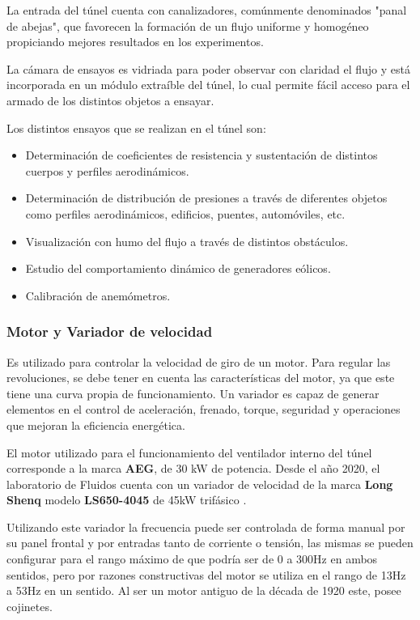 	La entrada del túnel cuenta con canalizadores, comúnmente denominados "panal de abejas", que favorecen la formación de un flujo uniforme y homogéneo propiciando mejores resultados en los experimentos.
	
	La cámara de ensayos es vidriada para poder observar con claridad el flujo y está incorporada en un módulo extraíble del túnel, lo cual permite fácil acceso para el armado de los distintos objetos a ensayar.
	
	Los distintos ensayos que se realizan en el túnel son:
	\begin{itemize}
		\item  Determinación de coeficientes de resistencia y sustentación de distintos cuerpos y perfiles aerodinámicos. 
		\item Determinación de distribución de presiones a través de diferentes objetos como perfiles aerodinámicos, edificios, puentes, automóviles, etc.
		\item Visualización con humo del flujo a través de distintos obstáculos.
		\item Estudio del comportamiento dinámico de generadores eólicos. 
		\item Calibración de anemómetros.
	\end{itemize}

	\subsubsection{Motor y Variador de velocidad}
		\begin{tcolorbox}[colback=blue!5!white,colframe=blue!75!black,title=Variador de velocidad]
			Es utilizado para controlar la velocidad de giro de un motor. Para regular las revoluciones, se debe tener en cuenta las características del motor, ya que este tiene  una  curva  propia  de  funcionamiento.  Un  variador  es  capaz  de  generar elementos en el  control  de  aceleración,  frenado, torque,  seguridad  y operaciones que mejoran la eficiencia energética.\end{tcolorbox}	

		
El motor utilizado para el funcionamiento del ventilador interno del túnel corresponde a la marca \textbf{AEG}, de 30 kW de potencia\cite{barila1993desarrollo}. Desde el año 2020, el laboratorio de Fluidos cuenta con un variador de velocidad de la marca \textbf{Long Shenq} modelo \textbf{LS650-4045} de 45kW trifásico \cite{LS650}.
 
Utilizando este variador la frecuencia puede ser controlada de forma manual por su panel frontal y por entradas tanto de corriente o tensión, las mismas se pueden configurar para el rango máximo de que podría ser de 0 a 300Hz en ambos sentidos, pero por razones constructivas del motor se utiliza en el rango de 13Hz a 53Hz en un sentido. Al ser un motor antiguo de la década de 1920 este, posee cojinetes.



